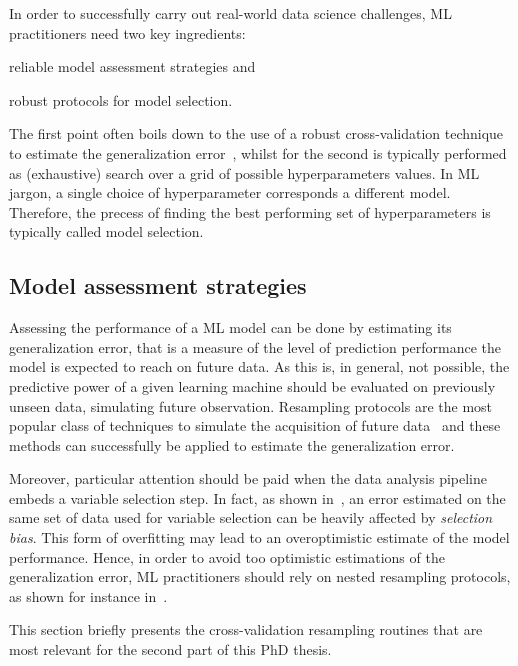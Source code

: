   In order to successfully carry out real-world data science challenges, ML practitioners need two key ingredients:
  \begin{enumerate*}[label=(\roman*)]
  	\item reliable model assessment strategies and %
  	\item robust protocols for model selection.
  \end{enumerate*}
  The first point often boils down to the use of a robust cross-validation technique to estimate the generalization error~\cite{molinaro2005prediction}, whilst for the second is typically performed as (exhaustive) search over a grid of possible hyperparameters values. 
  In ML jargon, a single choice of hyperparameter corresponds a different model. Therefore, the precess of finding the best performing set of hyperparameters is typically called model selection.

  \subsection{Model assessment strategies} \label{sec:model_evaluation}
  Assessing the performance of a ML model can be done by estimating its generalization error, that is a measure of the level of prediction performance the model is expected to reach on future data.
  As this is, in general, not possible, the predictive power of a given learning machine should be evaluated on previously unseen data, simulating future observation.
  Resampling protocols are the most popular class of techniques to simulate the acquisition of future data~\cite{molinaro2005prediction} and these methods can successfully be applied to estimate the generalization error.
  
  Moreover, particular attention should be paid when the data analysis pipeline embeds a variable selection step. In fact, as shown in~\cite{ambroise2002selection}, an error estimated on the same set of data used for variable selection can be heavily affected by \textit{selection bias}.
  This form of overfitting may lead to an overoptimistic estimate of the model performance.
  Hence, in order to avoid too optimistic estimations of the generalization error, ML practitioners should rely on nested resampling protocols, as shown for instance in~\cite{de2009regularized}.
  
  This section briefly presents the cross-validation resampling routines that are most relevant for the second part of this PhD thesis.
  
